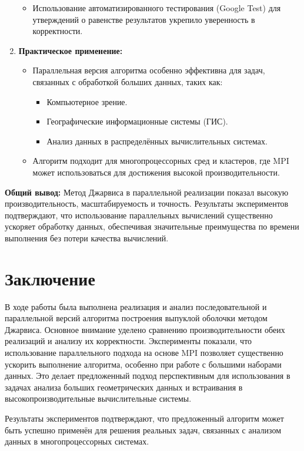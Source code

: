 \documentclass[a4paper,12pt]{article}
\begin{document}
\begin{enumerate}
\begin{itemize}
		\item Использование автоматизированного тестирования (Google Test) для утверждений о равенстве результатов укрепило уверенность в корректности.
	\end{itemize}
    \item \textbf{Практическое применение:}
	\begin{itemize}
	        \item Параллельная версия алгоритма особенно эффективна для задач, связанных с обработкой больших данных, таких как:
			\begin{itemize}
				\item Компьютерное зрение.
				\item Географические информационные системы (ГИС).
				\item Анализ данных в распределённых вычислительных системах.
			\end{itemize}
	        \item Алгоритм подходит для многопроцессорных сред и кластеров, где MPI может использоваться для достижения высокой производительности.
	    \end{itemize}
\end{enumerate}

\textbf{Общий вывод:}
Метод Джарвиса в параллельной реализации показал высокую производительность, масштабируемость и точность. Результаты экспериментов подтверждают, что использование параллельных вычислений существенно ускоряет обработку данных, обеспечивая значительные преимущества по времени выполнения без потери качества вычислений.

\newpage

\section{Заключение}
В ходе работы была выполнена реализация и анализ последовательной и параллельной версий алгоритма построения выпуклой оболочки методом Джарвиса. Основное внимание уделено сравнению производительности обеих реализаций и анализу их корректности. Эксперименты показали, что использование параллельного подхода на основе MPI позволяет существенно ускорить выполнение алгоритма, особенно при работе с большими наборами данных. Это делает предложенный подход перспективным для использования в задачах анализа больших геометрических данных и встраивания в высокопроизводительные вычислительные системы.

Результаты экспериментов подтверждают, что предложенный алгоритм может быть успешно применён для решения реальных задач, связанных с анализом данных в многопроцессорных системах.
\end{document}
